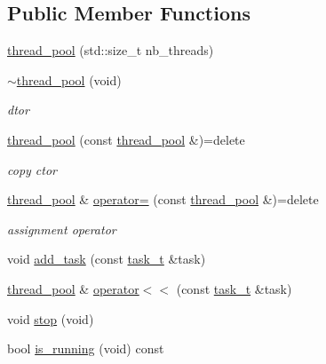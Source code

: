 \subsection*{Public Member Functions}
\begin{DoxyCompactItemize}
\item 
\hyperlink{classtacopie_1_1utils_1_1thread__pool_aa0068f000b8ecb21b2b0a0c50f77877c}{thread\+\_\+pool} (std\+::size\+\_\+t nb\+\_\+threads)
\item 
\hyperlink{classtacopie_1_1utils_1_1thread__pool_accddfc6fad613b0c6d407028799abfc5}{$\sim$thread\+\_\+pool} (void)
\begin{DoxyCompactList}\small\item\em dtor \end{DoxyCompactList}\item 
\hyperlink{classtacopie_1_1utils_1_1thread__pool_a63a850c39d21058eda9d655bb7eff452}{thread\+\_\+pool} (const \hyperlink{classtacopie_1_1utils_1_1thread__pool}{thread\+\_\+pool} \&)=delete
\begin{DoxyCompactList}\small\item\em copy ctor \end{DoxyCompactList}\item 
\hyperlink{classtacopie_1_1utils_1_1thread__pool}{thread\+\_\+pool} \& \hyperlink{classtacopie_1_1utils_1_1thread__pool_aa0077461da4da6ba3f4dcac029351234}{operator=} (const \hyperlink{classtacopie_1_1utils_1_1thread__pool}{thread\+\_\+pool} \&)=delete
\begin{DoxyCompactList}\small\item\em assignment operator \end{DoxyCompactList}\item 
void \hyperlink{classtacopie_1_1utils_1_1thread__pool_a450bee2b7b2cd0aa0bc3935c8adc9ace}{add\+\_\+task} (const \hyperlink{classtacopie_1_1utils_1_1thread__pool_a8ae8886fdeaa8e5c0abad12626a47296}{task\+\_\+t} \&task)
\item 
\hyperlink{classtacopie_1_1utils_1_1thread__pool}{thread\+\_\+pool} \& \hyperlink{classtacopie_1_1utils_1_1thread__pool_afb7befd9fa5f1fbd44423fddc8cbc5d3}{operator$<$$<$} (const \hyperlink{classtacopie_1_1utils_1_1thread__pool_a8ae8886fdeaa8e5c0abad12626a47296}{task\+\_\+t} \&task)
\item 
void \hyperlink{classtacopie_1_1utils_1_1thread__pool_a8874d7040d12fbe446519bc9f2bcff37}{stop} (void)
\item 
bool \hyperlink{classtacopie_1_1utils_1_1thread__pool_a77a647a75be188a5c5f83b922c061107}{is\+\_\+running} (void) const
\end{DoxyCompactItemize}
